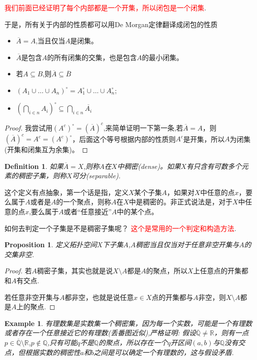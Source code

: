 \documentclass{article}
\newtheorem{proposition}[theorem]{Proposition}
\newtheorem{example}[theorem]{Example}
\newtheorem{definition}[theorem]{Definition}
\begin{document}
\textcolor{red}{我们前面已经证明了每个内部都是一个开集，所以闭包是一个闭集}.

于是，所有关于内部的性质都可以用De Morgan定律翻译成闭包的性质

\begin{itemize}
	\item $\overline{A} = A$,当且仅当$A$是闭集。
	\item $\overline{A}$是包含$A$的所有闭集的交集，也是包含$A$的最小闭集。
	\item 若$A \subseteq B$,则$\overline{A} \subseteq \overline{B}$
	\item $(A_1 \cup \ldots \cup A_n)^{\circ}=A_1^{\circ} \cup \ldots \cup A_n^{\circ}$;
	\item ${\left(\bigcap\limits_{i \in n} A_i\right)}^{\circ} \subseteq \bigcap\limits_{i \in n} \overline{A_i}$
\end{itemize}

\begin{proof}
我尝试用$(A^{c})^{\circ}=(\overline{A})^c$,来简单证明一下第一条,若$\overline{A}=A$，则$(\overline{A})^c = A^c=(A^{c})^{\circ}$，后面这个等号根据内部的性质则$A^c$是开集，所以$A$为闭集(开集和闭集互为余集)。
\end{proof}


\begin{definition}
如果$\overline{A}=X$,则称$A$在$X$中稠密(dense)。如果$X$有只含有可数多个元素的稠密子集，则称$X$可分(separable).
\end{definition}

这个定义有点抽象，第一个话是指，定义$X$某个子集$A$，如果对$X$中任意的点$x$，要么属于$A$或者是$A$的一个聚点，则称$A$在$X$中是稠密的。非正式说法是，对于$X$中任意的点$x$,要么属于$A$或者“任意接近”$A$中的某个点。

如何去判定一个子集是不是稠密子集呢？ \textcolor{red}{这个是常用的一个判定和构造方法}.
\begin{proposition}
定义拓扑空间$X$下子集$A$,$A$稠密当且仅当对于任意非空开集与$A$的交集非空.
\end{proposition}

\begin{proof}
若$A$稠密子集，其实也就是说$X \setminus A$都是$A$的聚点，所以$X$上任意点的开集都和$A$有交点.

若任意非空开集与$A$都非空，也就是说任意$x \in X$点的开集都与$A$非空，则$X \setminus A$都是$A$上的聚点.
\end{proof}

\begin{example}
有理数集是实数集一个稠密集，因为每一个实数，可能是一个有理数或者存在一个任意接近它的有理数(丢番图近似),严格证明: 假设$\overline{\mathbb{Q}} \neq \mathbb{R}$，则有一点$p \in \overline{\mathbb{Q}} \setminus \mathbb{R}$,$p \notin \mathbb{Q}$,只有可能$q$不是$\mathbb{Q}$的聚点，所以存在一个$q$开区间$(a,b)$与$\mathbb{Q}$没有交点，但根据实数的稠密性$a$和$b$之间是可以确定一个有理数的，这与假设矛盾.
\end{example}
\end{document}
